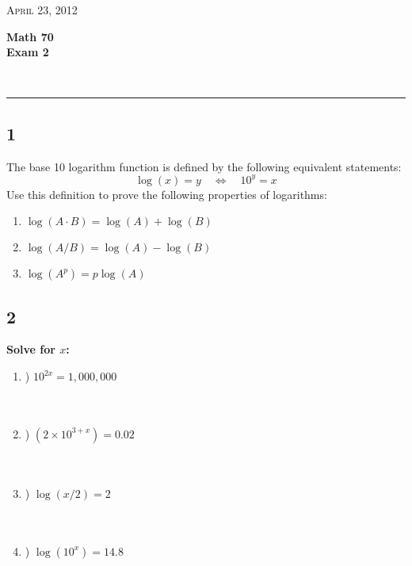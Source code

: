 \documentclass[11pt]{amsart}
\newcommand{\HRule}{\rule{\linewidth}{0.5mm}}
\begin{document}
\begin{minipage}{0.4\textwidth}
\begin{flushleft} \large
 \textsc{April 23, 2012}
\end{flushleft}
\end{minipage}
\begin{minipage}{0.6\textwidth}
\begin{flushright} \Large
{\bf Math 70   \\
Exam 2}
\end{flushright}
\end{minipage}\\

\HRule
\subsection*{1}
The base 10 logarithm function is defined by the following equivalent statements: 
$$ \log(x) = y \quad \Leftrightarrow \quad 10^y = x $$
Use this definition to prove the following properties of logarithms: 
\begin{enumerate}[a]
\item $\log(A\cdot B) = \log(A) + \log(B) $
\item $\log(A/B) = \log(A) - \log(B) $
\item $ \log(A^p) = p \log(A)$
\end{enumerate}




\newpage

\subsection*{2}   %
{\bf Solve for $x$:} 
\begin{enumerate}[a]
\item) $10^{2x} = 1,000,000$\\ \\ \\ 
\item) $(2\times 10^{3+x} )= 0.02 $ \\ \\ \\ 
\item) $\log(x/2) = 2 $ \\ \\ \\
\item) $ \log(10^x)= 14.8 $ \\ \\ \\
\end{enumerate}
\end{document}
